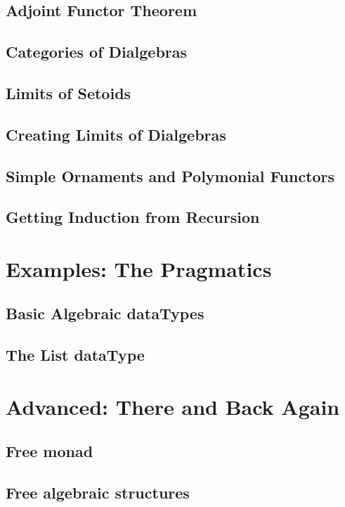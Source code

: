 \documentclass[11pt,oneside]{article}
\begin{document}
\subsection{Adjoint Functor Theorem}

\subsection{Categories of Dialgebras}

\subsection{Limits of Setoids}

\subsection{Creating Limits of Dialgebras}

\subsection{Simple Ornaments and Polymonial Functors}

\subsection{Getting Induction from Recursion}



\section{Examples: The Pragmatics}
\subsection{Basic Algebraic dataTypes}
\subsection{The List dataType}

\section{Advanced: There and Back Again}
\subsection{Free monad}
\subsection{Free algebraic structures}
\end{document}
